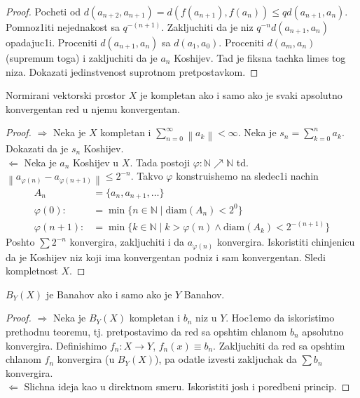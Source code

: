 \documentclass[a4paper,12pt]{article}
\newcommand{\NN}{\mathbb{N}}
\newcommand{\norm}[1]{\left\lVert#1\right\rVert}
\begin{document}
\begin{proof}
Pocheti od $d(a_{n+2}, a_{n+1}) = d(f(a_{n+1}), f(a_n)) \leq q d(a_{n+1}, a_n)$. Pomnoz1iti nejednakost sa $q^{-(n+1)}$. Zakljuchiti da je niz $q^{-n} d(a_{n+1}, a_n)$ opadajuc1i. Proceniti $d(a_{n+1}, a_n)$ sa $d(a_1, a_0)$. Proceniti $d(a_m, a_n)$ (supremum toga) i zakljuchiti da je $a_n$ Koshijev. Tad je fiksna tachka limes tog niza. Dokazati jedinstvenost suprotnom pretpostavkom.
\end{proof}

\begin{tma}
Normirani vektorski prostor $X$ je kompletan ako i samo ako je svaki apsolu\-tno konvergentan red u njemu konvergentan.
\end{tma}
\begin{proof}
$\boxed{\Rightarrow}$ Neka je $X$ kompletan i $\sum_{n=0}^{\infty} \norm{a_k}<\infty$. Neka je $s_n = \sum_{k=0}^n a_k$. Dokazati da je $s_n$ Koshijev. \\
$\boxed{\Leftarrow}$ Neka je $a_n$ Koshijev u $X$. Tada postoji $\varphi: \NN \nearrow \NN$ td. $\norm{a_{\varphi(n)} - a_{\varphi(n+1)}} \leq 2^{-n}$.
	Takvo $\varphi$ konstruishemo na sledec1i nachin
	\begin{align*}
		A_n &= \{ a_n, a_{n+1},\dotso \} \\
		\varphi(0) :&= \min\{n \in \NN \mid \mathrm{diam}(A_n) < 2^0 \}\\
		\varphi(n+1) :&=\min\{k \in \NN \mid k>\varphi(n) \land \mathrm{diam}(A_k) < 2^{-(n+1)} \} 
	\end{align*}
	Poshto $\sum 2^{-n}$ konvergira, zakljuchiti i da $a_{\varphi(n)}$ konvergira. Iskoristiti chinjenicu da je Koshijev niz koji ima konvergentan podniz i sam konvergentan. Sledi kompletnost $X$.
\end{proof}

\begin{tma}
$B_Y(X)$ je Banahov ako i samo ako je $Y$ Banahov.
\end{tma}
\begin{proof}
	$\boxed{\Rightarrow}$ Neka je $B_Y(X)$ kompletan i $b_n$ niz u $Y$. Hoc1emo da iskoristimo prethodnu teoremu, tj. pretpostavimo da red sa 
	opshtim chlanom $b_n$ apsolutno konvergira. Defini\-shimo $f_n:X\to Y$, $f_n(x) \equiv b_n$. Zakljuchiti da red sa opshtim chlanom $f_n$ konvergira
	(u $B_Y(X)$), pa odatle izvesti zakljuchak da $\sum b_n$ konvergira. \\
	$\boxed{\Leftarrow}$ Slichna ideja kao u direktnom smeru. Iskoristiti josh i poredbeni princip.
\end{proof}
\end{document}
